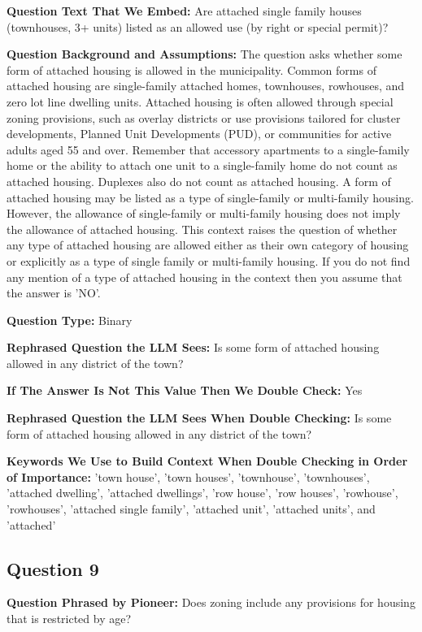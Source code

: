 \noindent\textbf{Question Text That We Embed:} Are attached single family houses (townhouses, 3+ units) listed as an allowed use (by right or special permit)?

\noindent\textbf{Question Background and Assumptions:} The question asks whether some form of attached housing is allowed in the municipality. Common forms of attached housing are single-family attached homes, townhouses, rowhouses, and zero lot line dwelling units. Attached housing is often allowed through special zoning provisions, such as overlay districts or use provisions tailored for cluster developments, Planned Unit Developments (PUD), or communities for active adults aged 55 and over. Remember that accessory apartments to a single-family home or the ability to attach one unit to a single-family home do not count as attached housing. Duplexes also do not count as attached housing. A form of attached housing may be listed as a type of single-family or multi-family housing. However, the allowance of single-family or multi-family housing does not imply the allowance of attached housing. This context raises the question of whether any type of attached housing are allowed either as their own category of housing or explicitly as a type of single family or multi-family housing. If you do not find any mention of a type of attached housing in the context then you assume that the answer is 'NO'.

\noindent\textbf{Question Type:} Binary

\noindent\textbf{Rephrased Question the LLM Sees:} Is some form of attached housing allowed in any district of the town?

\noindent\textbf{If The Answer Is Not This Value Then We Double Check:} Yes

\noindent\textbf{Rephrased Question the LLM Sees When Double Checking:} Is some form of attached housing allowed in any district of the town?

\noindent\textbf{Keywords We Use to Build Context When Double Checking in Order of Importance:}
\noindent 'town house', 'town houses', 'townhouse', 'townhouses', 'attached dwelling', 'attached dwellings', 'row house', 'row houses', 'rowhouse', 'rowhouses', 'attached single family', 'attached unit', 'attached units', and 'attached'
\vspace{1cm}
\subsection*{Question 9}
\noindent\textbf{Question Phrased by Pioneer:} Does zoning include any provisions for housing that is restricted by age?


